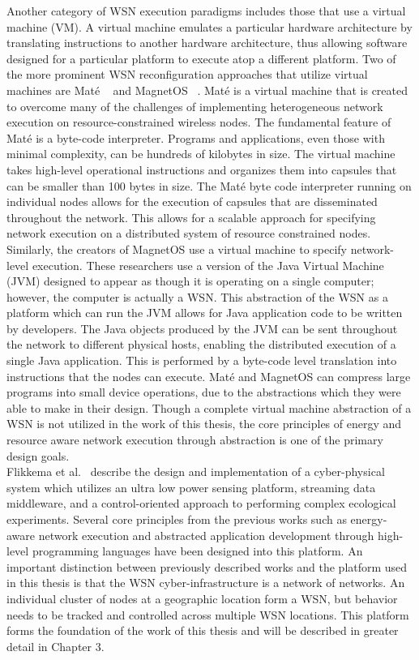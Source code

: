 Another category of WSN execution paradigms includes those that use a virtual machine (VM). A virtual machine emulates a particular hardware architecture by translating instructions to another hardware architecture, thus allowing software designed for a particular platform to execute atop a different platform. Two of the more prominent WSN reconfiguration approaches that utilize virtual machines are Mat\'e ~\cite{Levis} and MagnetOS ~\cite{Barr}. Mat\'e is a virtual machine that is created to overcome many of the challenges of implementing heterogeneous network execution on resource-constrained wireless nodes. The fundamental feature of Mat\'e is a byte-code interpreter. Programs and  applications, even those with minimal complexity, can be hundreds of kilobytes in size. The virtual machine takes high-level operational instructions and organizes them into capsules that can be smaller than 100 bytes in size. The Mat\'e byte code interpreter running on individual nodes allows for the execution of capsules that are disseminated throughout the network. This allows for a scalable approach for specifying network execution on a distributed system of resource constrained nodes. Similarly, the creators of MagnetOS use a virtual machine to specify network-level execution. These researchers use a version of the Java Virtual Machine (JVM) designed to appear as though it is operating on a single computer; however, the computer is actually a WSN. This abstraction of the WSN as a platform which can run the JVM allows for Java application code to be written by developers. The Java objects produced by the JVM can be sent throughout the network to different physical hosts, enabling the distributed execution of a single Java application. This is performed by a byte-code level translation into instructions that the nodes can execute. Mat\'e and MagnetOS can compress large programs into small device operations, due to the abstractions which they were able to make in their design. Though a complete virtual machine abstraction of a WSN is not utilized in the work of this thesis, the core principles of energy and resource aware network execution through abstraction is one of the primary design goals. \\

Flikkema et al.~\cite{Flikkema} describe the design and implementation of a cyber-physical system which utilizes an ultra low power sensing platform, streaming data middleware, and a control-oriented approach to performing complex ecological experiments. Several core principles from the previous works such as energy-aware network execution and abstracted application development through high-level programming languages have been designed into this platform. An important distinction between previously described works and the platform used in this thesis is that the WSN cyber-infrastructure is a network of networks. An individual cluster of nodes at a geographic location form a WSN, but behavior needs to be tracked and controlled across multiple WSN locations. This platform forms the foundation of the work of this thesis and will be described in greater detail in Chapter 3.

